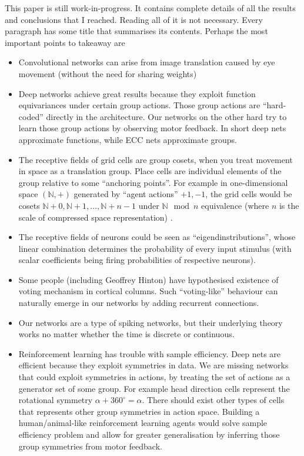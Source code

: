 \documentclass[12pt]{article}
\begin{document}
This paper is still work-in-progress. It contains complete details of all the results and conclusions that I reached. Reading all of it is not necessary. Every paragraph has some title that summarises its contents. Perhaps the most important points to takeaway are 
\begin{itemize}
	\item Convolutional networks can arise from image translation caused by eye movement (without the need for sharing weights)
	\item Deep networks achieve great results because they exploit function equivariances under certain group actions. Those group actions are ``hard-coded'' directly in the architecture. Our networks on the other hard try to learn those group actions by observing motor feedback. In short deep nets approximate functions, while ECC nets approximate groups.
	\item The receptive fields of grid cells are group cosets, when you treat movement in space as a translation group. Place cells are individual elements of the group relative to some ``anchoring points''. For example in one-dimensional space $(\mathbb{N},+)$ generated by ``agent actions'' $+1,-1$, the grid cells would be cosets $\mathbb{N}+0,\mathbb{N}+1,...,\mathbb{N}+n-1$ under $\mathbb{N} \mod n$ equivalence (where $n$ is the scale of compressed space representation) .
	\item The receptive fields of neurons could be seen as ``eigendinstributions'', whose linear combination determines the probability of every input stimulus  (with scalar coefficients being firing probabilities of respective neurons).
	\item Some people (including Geoffrey Hinton) have hypothesised existence of voting mechanism in cortical columns. Such ``voting-like'' behaviour can naturally emerge in our networks by adding recurrent connections.
	\item Our networks are a type of spiking networks, but their underlying theory works no matter whether the time is discrete or continuous.
	\item Reinforcement learning has trouble with sample efficiency. Deep nets are efficient because they exploit symmetries in data. We are missing networks that could exploit symmetries in actions, by treating the set of actions as a generator set of some group. For example head direction cells represent the rotational symmetry  $\alpha + 360^{\circ} = \alpha$. There should exist other types of cells that represents other group symmetries in action space. Building a human/animal-like reinforcement learning agents would solve sample efficiency problem and allow for greater generalisation by inferring those group symmetries from motor feedback.
\end{itemize}
\end{document}
